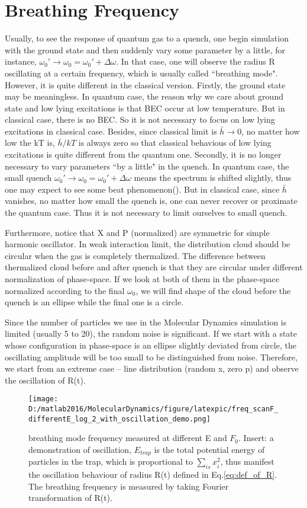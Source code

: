 \documentclass[aps,pre,twocolumn,groupedaddress]{revtex4-1}
\begin{document}
\section{Breathing Frequency}\label{section:breathing frequency}
Usually, to see the response of quantum gas to a quench, one begin simulation with the ground state and then suddenly vary some parameter by a little, for instance, $\omega_0'\rightarrow\omega_0=\omega_0'+\Delta\omega$. In that case, one will observe the radius R oscillating at a certain frequency, which is usually called ``breathing mode".
However, it is quite different in the classical version. Firstly, the ground state may be meaningless. In quantum case, the reason why we care about ground state and low lying excitations is that BEC occur at low temperature. But in classical case, there is no BEC. So it is not necessary to focus on low lying excitations in classical case. Besides, since classical limit is $\bar{h}\rightarrow 0$, no matter how low the kT is, $\bar{h}/kT$ is always zero so that classical behavious of low lying excitations is quite different from the quantum one. Secondly, it is no longer necessary to vary parameters ``by a little" in the quench. In quantum case, the small quench $\omega_0'\rightarrow\omega_0=\omega_0'+\Delta\omega$ means the spectrum is shifted slightly, thus one may expect to see some beat phenomenon({\color{red}{?}}). But in classical case, since $\bar{h}$ vanishes, no matter how small the quench is, one can never recover or proximate the quantum case. Thus it is not necessary to limit ourselves to small quench. 

Furthermore, notice that X and P (normalized) are symmetric for simple harmonic oscillator. In weak interaction limit, the distribution cloud should be circular when the gas is completely thermalized. The difference between thermalized cloud before and after quench is that they are circular under different normalization of phase-space. If we look at both of them in the phase-space normalized according to the final $\omega_0$, we will find shape of the cloud before the quench is an ellipse while the final one is a circle.

Since the number of particles we use in the Molecular Dynamics simulation is limited (usually 5 to 20), the random noise is significant. If we start with a state whose configuration in phase-space is an ellipse slightly deviated from circle, the oscillating amplitude will be too small to be distinguished from noise. Therefore, we start from an extreme case -- line distribution (random x, zero p) and observe the oscillation of R(t). 
\begin{figure}[hbtp]
\center
\texttt{[image: D:/matlab2016/MolecularDynamics/figure/latexpic/freq\_scanF\_differentE\_log\_2\_with\_oscillation\_demo.png]}
\caption{breathing mode frequency measured at different E and $F_0$. Insert: a demonstration of oscillation, $E_{trap}$ is the total potential energy of particles in the trap, which is proportional to $\sum_{is}{x_i^2}$, thus manifest the oscillation behaviour of radius R(t) defined in Eq.\ref{eq:def_of_R}. The breathing frequency is measured by taking Fourier transformation of R(t).}
\label{fig:Breathingfrequency1}
\end{figure}
\end{document}
